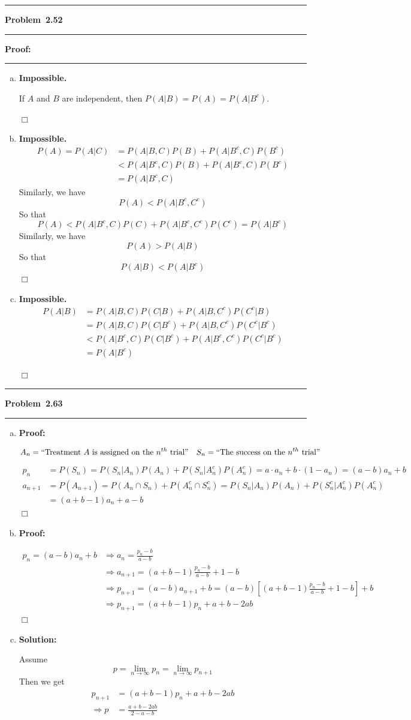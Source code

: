 \documentclass[10.5pt]{article}
\newcommand\question[1]{\vspace{.2in}\hrule\vspace{0.04in}\textbf{Problem\ #1}\vspace{.4em}\hrule\vspace{.10in}}
\newcommand\Proof{\vspace{.3in}\textbf{Proof:}\vspace{.5em}\hrule\vspace{.08in}\par}
\newcommand\minsolution{\vspace{.3in}\textbf{Solution:}\vspace{.4em}\par}
\newcommand\minproof{\vspace{.3in}\textbf{Proof:}\vspace{.4em}\par}
\begin{document}
\question{2.52}
\Proof{}
\begin{enumerate}[(a)]
	\item \textbf{Impossible.} 
	
	If $A$ and $B$ are independent, then $P(A|B) = P(A) = P(A|B^c)$.
	
	$\Box$
	\vspace{2cm}
	\item \textbf{Impossible.} \begin{align*}
		P(A) = P(A|C) 
		&= P(A|B, C)P(B)+P(A|B^c, C)P(B^c)\\[8pt]
		&< P(A|B^c, C)P(B)+P(A|B^c, C)P(B^c)\\[8pt]
		& = P(A|B^c, C)
	\end{align*}
	Similarly, we have $$P(A)<P(A|B^c, C^c)$$
	So that $$P(A)<P(A|B^c, C)P(C)+P(A|B^c, C^c)P(C^c) = P(A|B^c)$$
	Similarly, we have $$P(A)>P(A|B)$$
	So that $$P(A|B)<P(A|B^c)$$ $\Box$
\vspace{2cm}
	\item \textbf{Impossible.}\begin{align*}
		P(A|B) 
		&= P(A|B, C)P(C|B)+P(A|B, C^c)P(C^c|B)\\[8pt]
		&= P(A|B, C)P(C|B^c)+P(A|B, C^c)P(C^c|B^c)\\[8pt]
		&< P(A|B^c, C)P(C|B^c)+P(A|B^c, C^c)P(C^c|B^c)\\[8pt]
		&= P(A|B^c)
	\end{align*}

	$\Box$
\end{enumerate}

\pagebreak

\question{2.63}
\begin{enumerate}[(a)]
	\item \minproof{}
	$$A_n = ``\text{Treatment $A$ is assigned on the $n^{th}$ trial}"\quad S_n = ``\text{The success on the $n^{th}$ trial}"$$
	\begin{align*}
		p_n &= P(S_n) = P(S_n|A_n)P(A_n)+P(S_n|A^c_n)P(A_n^c) = a\cdot a_n+b\cdot(1-a_n) = (a-b)a_n+b\\[8pt]
		a_{n+1} &= P(A_{n+1}) = P(A_n\cap S_n)+P(A_n^c\cap S_n^c)=P(S_n|A_n)P(A_n)+P(S_n^c|A_n^c)P(A_n^c)\\[8pt]
		&= (a+b-1)a_n+a-b
	\end{align*}
	$\Box$
	\item \minproof{}
	\begin{align*}
		p_n=(a-b)a_n+b
		&\Rightarrow a_n = \frac{p_n-b}{a-b}\\[8pt]
		&\Rightarrow a_{n+1} = (a+b-1)\frac{p_n-b}{a-b}+1-b\\[8pt]
		&\Rightarrow p_{n+1} = (a-b)a_{n+1}+b = (a-b)\left[(a+b-1)\frac{p_n-b}{a-b}+1-b\right]+b\\[8pt]
		&\Rightarrow p_{n+1} = (a+b-1)p_n+a+b-2ab
	\end{align*}
	$\Box$
	\item \minsolution{}Assume$$p = \lim_{n \to \infty} p_n = \lim_{n \to \infty} p_{n+1}$$
	Then we get
	\begin{align*}
		p_{n+1} &= (a+b-1)p_n+a+b-2ab\\[8pt]
		\Rightarrow p &= \frac{a+b-2ab}{2-a-b}
	\end{align*}
\end{enumerate}
\end{document}

